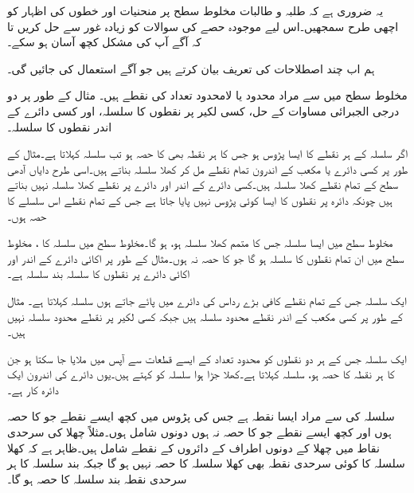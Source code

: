 یہ ضروری ہے کہ طلبہ و طالبات مخلوط سطح پر منحنیات اور خطوں کی اظہار کو اچھی طرح سمجھیں۔اس لیے موجودہ حصے کی سوالات کو زیادہ غور سے حل کریں تا کہ آگے آپ کی مشکل کچھ آسان ہو سکے۔

ہم اب چند اصطلاحات کی تعریف  بیان کرتے ہیں جو آگے استعمال کی جائیں گی۔

مخلوط سطح میں  سے مراد محدود یا لامحدود تعداد کی نقطے ہیں۔  مثال کے طور پر دو درجی الجبرائی مساوات کے حل، کسی لکیر پر نقطوں کا سلسلہ، اور کسی دائرے کے اندر نقطوں کا سلسلہ۔

اگر سلسلہ  کے ہر نقطے کا ایسا پڑوس ہو جس کا ہر نقطہ بھی  کا حصہ ہو تب   سلسلہ  کہلاتا ہے۔مثال کے طور پر کسی دائرے یا مکعب کے اندرون تمام نقطے  مل کر کھلا سلسلہ بناتے ہیں۔اسی طرح دایاں آدھی سطح  کے تمام نقطے کھلا سلسلہ ہیں۔کسی دائرے کے اندر اور دائرے پر نقطے  کھلا سلسلہ نہیں بناتے ہیں چونکہ دائرہ پر نقطوں کا ایسا کوئی پڑوس نہیں پایا جاتا ہے جس کے تمام نقطے اس سلسلے کا حصہ ہوں۔

 مخلوط سطح میں ایسا سلسلہ جس کا متمم کھلا سلسلہ ہو،  ہو گا۔مخلوط سطح میں سلسلہ  کا ، مخلوط سطح میں ان تمام نقطوں کا سلسلہ ہو گا جو  کا حصہ نہ ہوں۔مثال کے طور پر اکائی دائرے کے اندر اور اکائی دائرے پر نقطوں کا سلسلہ بند سلسلہ ہے۔

ایک سلسلہ جس کے تمام نقطے کافی بڑے رداس کی دائرے میں پائے جاتے ہوں  سلسلہ کہلاتا ہے۔ مثال کے طور پر کسی مکعب کے اندر نقطے محدود سلسلہ ہیں جبکہ کسی لکیر پر نقطے محدود سلسلہ نہیں ہیں۔

ایک سلسلہ  جس کے ہر دو نقطوں کو محدود تعداد کے ایسے قطعات سے آپس میں ملایا جا سکتا ہو جن کا ہر نقطہ  کا حصہ ہو،  سلسلہ کہلاتا ہے۔کھلا جڑا ہوا سلسلہ کو  کہتے ہیں۔یوں دائرے کی اندرون ایک دائرہ کار ہے۔

سلسلہ  کی  سے مراد  ایسا نقطہ ہے جس کی پڑوس میں کچھ ایسے  نقطے جو  کا حصہ ہوں اور کچھ ایسے  نقطے جو  کا حصہ نہ ہوں دونوں شامل ہوں۔مثلاً چھلا کی سرحدی نقاط میں چھلا کے دونوں اطراف کے دائروں کے نقطے  شامل ہیں۔ظاہر ہے کہ کھلا سلسلہ  کا کوئی سرحدی نقطہ  بھی کھلا سلسلہ کا حصہ نہیں ہو گا جبکہ بند سلسلہ کا ہر سرحدی نقطہ بند سلسلہ کا حصہ ہو گا۔

